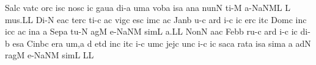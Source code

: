 \spatium
\sgn Sal\punctum c\egn
\sgn vat\punctum c\egn
\sgn {}or\punctum c\egn
\sgn {}is\punctum c\egn
\spatium
\sgn nos\punctum c\egn
{}i{}\punctum c\egn
\spatium
\sgn gau\punctum a\egn
\sgn di-\punctum a\egn
\sgn {}um\punctum a\egn
\spatium
\sgn vob\punctum a\egn
\sgn {}is\punctum a\egn
\spatium
\sgn {}an\punctum a\egn
\sgn nun\punctum N\egn
\sgn ti-\punctum M\egn
\sgn {}a-\pessubbipunctis NaNM\nonspatium\punctuminclinatum L\egn
\custos L
\lineaproxima
\sgn mu{s.}\punctum L\augmentum L\egn
\spatium
\divisiofinalis
\spatium
\sgn Di-\punctum N\egn
\sgn {}e{}\pes ac\egn
\spatium
\sgn ter\punctum c\egn
\sgn ti-\punctum c\egn
\sgn {}a{}\punctum c\egn
\spatium
\sgn vig\punctum c\egn
\sgn {}es\punctum c\egn
\sgn {}im\punctum c\egn
\sgn {}a{}\punctum c\egn
\spatium
\sgn Jan\punctum b\egn
\sgn {}u-\punctum c\egn
\sgn {}ar\punctum d\egn
\sgn {}i-\punctum c\egn
\sgn {}i{}\punctum c\egn
\spatium
\sgn {}er\punctum c\egn
\sgn {}it\punctum c\egn
\spatium
\sgn Dom\punctum c\egn
\sgn {}in\punctum c\egn
\sgn {}ic\punctum c\egn
\sgn {}a{}\punctum c\egn
\spatium
\sgn {}in\punctum a\egn
\spatium
\custos a
\lineaproxima
\sgn Sep\punctum a\egn
\sgn tu-\punctum N\egn
\sgn {}ag\punctum M\egn
\sgn {}e-\pessubbipunctis NaNM\egn
\sgn sim\punctum L\egn
\sgn {}a.\punctum L\augmentum L\egn
\spatium
\divisiofinalis
\spatium
\sgn Non\punctum N\egn
\sgn {}a{}\pes ac\egn
\spatium
\sgn Feb\punctum b\egn
\sgn ru-\punctum c\egn
\sgn {}ar\punctum d\egn
\sgn {}i-\punctum c\egn
\sgn {}i{}\punctum c\egn
\spatium
\sgn di-\punctum b\egn
\sgn {}es\punctum a\egn
\spatium
\sgn Cin\pes bc\egn
\sgn {}er\punctum a\egn
\sgn {}u{m,}\punctum a\egn
\spatium
\divisiominima
\spatium
\custos d
\lineaproxima
\sgn { }et\punctum d\egn
\spatium
\sgn {}in\punctum c\egn
\sgn {}it\punctum c\egn
\sgn {}i-\punctum c\egn
\sgn {}um\punctum c\egn
\spatium
\sgn jej\punctum c\egn
\sgn {}un\punctum c\egn
\sgn {}i-\punctum c\egn
\sgn {}i{}\punctum c\egn
\spatium
\sgn sac\punctum a\egn
\sgn rat\punctum a\egn
\sgn {}is\punctum a\egn
\sgn sim\punctum a\egn
\sgn {}{\ae}{}\punctum a\egn
\spatium
{}ad\punctum N\egn
\sgn rag\punctum M\egn
\sgn {}e-\pessubbipunctis NaNM\egn
\sgn sim\punctum L\egn
\sgn {}{\ae}{}\punctum L\augmentum L\egn
